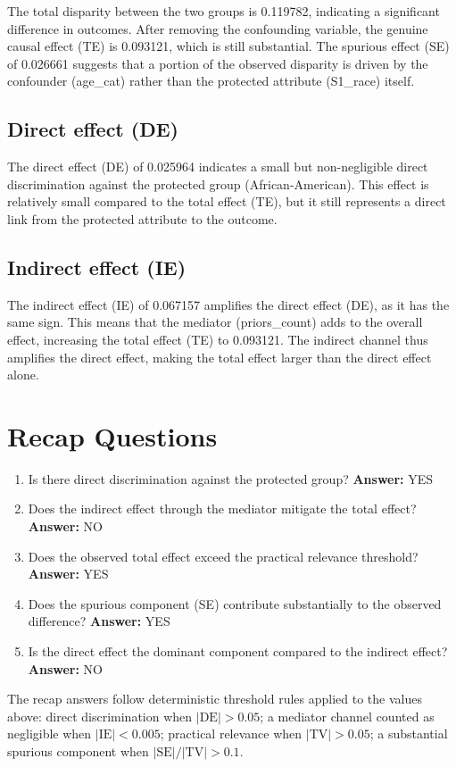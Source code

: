 \documentclass[11pt]{article}
\begin{document}
The total disparity between the two groups is 0.119782, indicating a significant difference in outcomes. After removing the confounding variable, the genuine causal effect (TE) is 0.093121, which is still substantial. The spurious effect (SE) of 0.026661 suggests that a portion of the observed disparity is driven by the confounder (age\_cat) rather than the protected attribute (S1\_race) itself.

\subsection{Direct effect (DE)}

The direct effect (DE) of 0.025964 indicates a small but non-negligible direct discrimination against the protected group (African-American). This effect is relatively small compared to the total effect (TE), but it still represents a direct link from the protected attribute to the outcome.

\subsection{Indirect effect (IE)}

The indirect effect (IE) of 0.067157 amplifies the direct effect (DE), as it has the same sign. This means that the mediator (priors\_count) adds to the overall effect, increasing the total effect (TE) to 0.093121. The indirect channel thus amplifies the direct effect, making the total effect larger than the direct effect alone.

\section{Recap Questions}

\begin{enumerate}
\item Is there direct discrimination against the protected group? \textbf{Answer:} YES
\item Does the indirect effect through the mediator mitigate the total effect? \textbf{Answer:} NO
\item Does the observed total effect exceed the practical relevance threshold? \textbf{Answer:} YES
\item Does the spurious component (SE) contribute substantially to the observed difference? \textbf{Answer:} YES
\item Is the direct effect the dominant component compared to the indirect effect? \textbf{Answer:} NO
\end{enumerate}

\vspace{1em}
\noindent\footnotesize
The recap answers follow deterministic threshold rules applied to the values above: direct discrimination when $|\mathrm{DE}| > 0.05$; a mediator channel counted as negligible when $|\mathrm{IE}| < 0.005$; practical relevance when $|\mathrm{TV}| > 0.05$; a substantial spurious component when $|\mathrm{SE}| / |\mathrm{TV}| > 0.1$.
\end{document}
